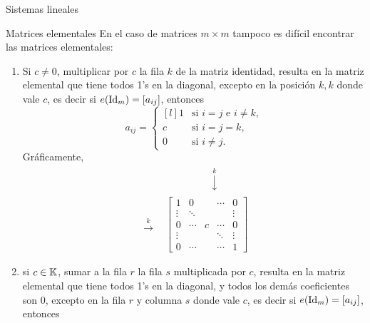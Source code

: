 \begin{chapter}{Sistemas lineales}
\begin{section}{Matrices elementales}
            En el caso de matrices $m \times m$ tampoco es difícil encontrar las matrices elementales:
            \begin{enumerate}
                \item Si $c \not=0$, multiplicar por  $c$ la fila $k$ de la matriz identidad, resulta en la matriz elemental que tiene todos 1's en la diagonal, excepto en la posición $k,k$ donde vale $c$,  es decir si $e(\operatorname{Id}_m) = [a_{ij}]$,  entonces
                \begin{equation}\label{elem-tipo-1}
                a_{ij} = \left\{ 
                \begin{matrix*}[l]
                1 &\text{si $i=j$ e $i\ne k$,}\\
                c &\text{si $i=j=k$,} \\
                0 \quad&\text{si $i \ne j$.}
                \end{matrix*}\right.
                \end{equation}
                Gráficamente,
                \begin{align*}
                &\begin{matrix}
                {}^{}&{}^{}&{}^{}&{}^{}&{}^{}&\overset{k}{\downarrow}&{}^{}&{}^{}&{}^{}
                \end{matrix} \\
                \begin{matrix}
                {}^{}\\
                {}^{}\\
                \overset{k}{\to}\\
                {}^{}\\
                {}^{}
                \end{matrix}
                &\begin{bmatrix}
                1 & 0 &  &\cdots & 0  \\
                \vdots  & \ddots  & & & \vdots \\
                0 & \cdots &c &\cdots &0 \\
                \vdots  &   & &\ddots & \vdots \\
                0  & \cdots  & &\cdots & 1
                \end{bmatrix}
                \end{align*}
                \item si  $c \in \mathbb K$, sumar a la fila $r$  la fila $s$ multiplicada por $c$, resulta en la matriz elemental que tiene todos 1's en la diagonal, y todos los demás coeficientes son 0,  excepto en la fila  $r$ y columna $s$ donde  vale $c$,  es decir si $e(\operatorname{Id}_m) = [a_{ij}]$,  entonces

\end{enumerate}
\end{section}
\end{chapter}
